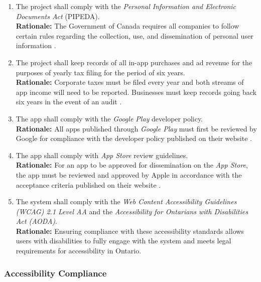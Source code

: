 \documentclass{article}
\begin{document}
\begin{enumerate}[align=left, label=\textbf{CO\arabic*.}]
    \item The project shall comply with the \emph{Personal Information and Electronic Documents Act} (PIPEDA).\\
          {\bf Rationale:} The Government of Canada requires all companies to follow certain rules regarding the collection, use, and dissemination of personal user information \cite{PIPEDA}.
    \item The project shall keep records of all in-app purchases and ad revenue for the purposes of yearly tax filing for the period of six years.\\
          {\bf Rationale:} Corporate taxes must be filed every year and both streams of app income will need to be reported. Businesses must keep records going back six years in the event of an audit \cite{6Year}.
    \item The app shall comply with the \emph{Google Play} developer policy.\\
          {\bf Rationale:} All apps published through \emph{Google Play} must first be reviewed by Google for compliance with the developer policy published on their website \cite{GooglePlay}.
    \item The app shall comply with \emph{App Store} review guidelines.\\
          {\bf Rationale:} For an app to be approved for dissemination on the \emph{App Store}, the app must be reviewed and approved by Apple in accordance with the acceptance criteria published on their website \cite{AppStore}.
     \item The system shall comply with the \emph{Web Content Accessibility Guidelines (WCAG) 2.1 Level AA} and the \emph{Accessibility for Ontarians with Disabilities Act (AODA)}. \\
        {\bf Rationale:} Ensuring compliance with these accessibility standards allows users with disabilities to fully engage with the system and meets legal requirements for accessibility in Ontario. \\

\end{enumerate}

\subsubsection{Accessibility Compliance}
\end{document}
